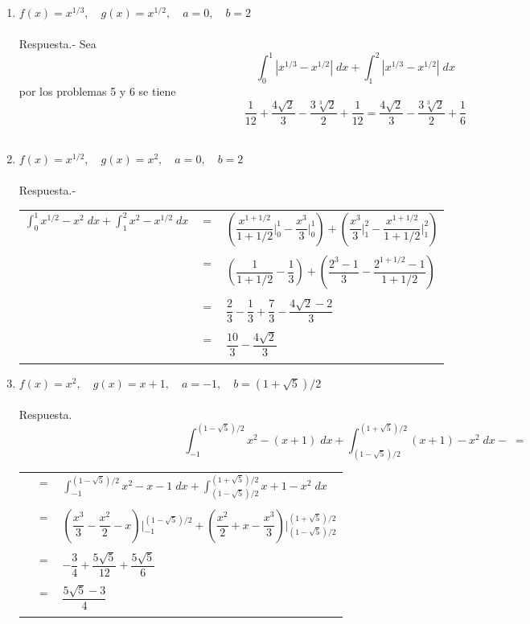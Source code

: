 \begin{enumerate}[\bfseries 1.]
\item $f(x)=x^{1/3},\quad g(x) = x^{1/2}, \quad a = 0,\quad b=2$\\\\
    Respuesta.-\; Sea $$\int_0^1 |x^{1/3}-x^{1/2}|\; dx + \int_1^2 |x^{1/3}-x^{1/2}|\; dx$$
    por los problemas 5 y 6 se tiene $$\dfrac{1}{12} + \dfrac{4\sqrt{2}}{3}-\dfrac{3\sqrt[3]{2}}{2}+\dfrac{1}{12} = \dfrac{4\sqrt{2}}{3}-\dfrac{3\sqrt[3]{2}}{2}+\dfrac{1}{6}$$\\

\item $f(x) = x^{1/2}, \quad g(x) = x^2, \quad a=0, \quad b=2$\\\\
    Respuesta.-\;
    \begin{center}
	\begin{tabular}{rcl}
	    $\displaystyle\int_0^1 x^{1/2} - x^2 \; dx + \int_1^2 x^2 - x^{1/2}\; dx$ & $=$ & $\left(\dfrac{x^{1+1/2}}{1+1/2}\bigg|_0^1 - \dfrac{x^3}{3}\bigg|_0^1\right) + \left( \dfrac{x^3}{3}\bigg|_1^2 - \dfrac{x^{1+1/2}}{1+1/2}\bigg|_1^2 \right)$\\\\
	    & $=$ & $\left(\dfrac{1}{1+1/2} - \dfrac{1}{3}\right) + \left(\dfrac{2^3-1}{3} - \dfrac{2^{1+1/2} - 1}{1+1/2}\right)$\\\\
	    & $=$ & $\dfrac{2}{3} - \dfrac{1}{3} + \dfrac{7}{3} - \dfrac{4\sqrt{2}-2}{3}$\\\\
	    &$=$&$\dfrac{10}{3}-\dfrac{4\sqrt{2}}{3}$\\\\
	\end{tabular}
    \end{center}

\item $f(x) = x^2, \quad g(x) = x+1, \quad a=-1, \quad b = (1+\sqrt{5})/2$\\\\
    Respuesta.$$\int_{-1}^{(1-\sqrt{5})/2} x^2 - (x+1)\; dx +  \int_{(1-\sqrt{5})/2}^{(1+\sqrt{5})/2} (x+1) - x^2\; dx-\; = $$
    \begin{center}
	\begin{tabular}{rcl}
	     & $=$ & $\displaystyle\int_{-1}^{(1-\sqrt{5})/2} x^2 - x - 1\; dx +  \int_{(1-\sqrt{5})/2}^{(1+\sqrt{5})/2} x + 1 - x^2 \; dx$ \\\\
	    & $=$ & $\left(\dfrac{x^3}{3} - \dfrac{x^2}{2} - x\right)\bigg|_{-1}^{(1-\sqrt{5})/2} + \left(\dfrac{x^2}{2} + x - \dfrac{x^3}{3}\right)\bigg|_{(1-\sqrt{5})/2}^{(1+\sqrt{5})/2}$ \\\\
	    & $=$ & $-\dfrac{3}{4} + \dfrac{5 \sqrt{5}}{12}+\dfrac{5\sqrt{5}}{6}$ \\\\
	    & $=$ & $\dfrac{5\sqrt{5}-3}{4}$\\\\
	\end{tabular}
    \end{center}


\end{enumerate}
